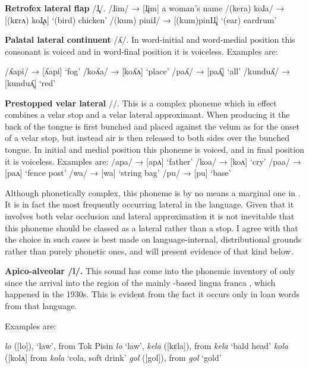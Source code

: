 \documentclass[output=paper]{langsci/langscibook}
\begin{document}
\vspace{5mm}
\noindent
\textbf{Retrofex lateral flap}  /ɺ̢/.
\ea
\ea
/ɺim/           →   [ɺ̢im] a woman’s name
\ex
/(kera) koɺa/   → [(k{ɛ}r{ʌ}) koɺ̢{ʌ}] ‘(bird) chicken’
\ex
/(kum) piniɺ/  → [(kum)pinIɺ̢] ‘(ear) eardrum’
\z
\z

\noindent
\textbf{Palatal lateral continuent} /ʎ/. In word-initial and word-medial position this consonant is voiced and in word-final position it is voiceless. Examples are: 

\ea
\ea
/{ʎ}api/        →  [{ʎ}api] ‘fog’
\ex
/ko{ʎ}a/       →  [ko{ʎ}{ʌ}] ‘place’
\ex
/pa{ʎ}/       →  [pa{ʎ̥}]  ‘all’
\ex
/kundu{ʎ}/  →  [kundu{ʎ̥}] ‘red’
\z
\z

\noindent
\textbf{Prestopped velar lateral} /{\gL}/. This is a complex phoneme which in effect combines a velar stop and a velar lateral approximant. When producing it the back of the tongue is first bunched and placed against the velum as for the onset of a velar stop, but instead air is then released to both sides over the bunched tongue. In initial and medial position this phoneme is voiced, and in final position it is voiceless. Examples are:
\ea
\ea
/{\gL}apa/    →  [{\gL}ap{ʌ}] ‘father’
\ex
/ko{\gL}a/   →  [ko{\gL}{ʌ}] ‘cry’
\ex
/pa{\gL}a/    →  [pa{\gL}{ʌ}]  ‘fence post’
\ex
/wa{\gL}/    →  [wa{\kL}]  ‘string bag’
\ex
/pu{\gL}/    →  [pu{\kL}]   ‘base’
\z
\z

Although phonetically complex, this phoneme is by no means a marginal one in . It is in fact the most frequently occurring lateral in the language. Given that it involves both velar occlusion and lateral approximation it is not inevitable that this phoneme should be classed as a lateral rather than a stop. I agree with \citet{François2010} that the choice in such cases is best made on language-internal, distributional grounds rather than purely phonetic ones, and will present evidence of that kind below.
\vspace{5mm}

 \noindent
\textbf{Apico-alveolar /l/.} This sound has come into the phonemic inventory of  only since the arrival into the region of the mainly -based lingua franca , which happened in the 1930s. This is evident from the fact it occurs only in loan words from that language. 

Examples are:

\ea
\ea
\textit{lo} ([lo]), ‘law’, from Tok  Pisin \textit{lo} ‘law’, 
\ex
\textit{kela} ([k{ɛ}la]), from  \textit{kela} ‘bald head’
\ex
\textit{kola} ([kol{ʌ}] from  \textit{kola} ‘cola, soft drink’
\ex
\textit{gol} ([gol]), from  \textit{gol} ‘gold’  
\z
\z
\end{document}
